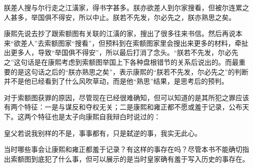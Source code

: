 
\begin{bookquote}朕差人搜与尔行走之江潢家，得书字甚多。朕亦欲差人到尔家搜看，但被尔连累之人甚多，举国俱不得安，所以中止。朕若不先发，尔必先之，朕亦熟思之矣。\end{bookquote}


康熙先说去抄了跟索额图有关联的江潢的家，搜出了很多往来书信。然后再说本来“欲差人”去索额图家“搜看”，但预料到在索额图家里会搜出来更多的材料，牵扯出更多人，导致“举国俱不得安”，所以最后打消了念头。“朕若不先发，尔必先之”这句话是在康熙考虑到索额图举国上下各种盘根错节的关系后说出的。而最重要的是这句话之后的“朕亦熟思之矣”，表示康熙的“朕若不先发，尔必先之”的判断并不是他已经看到了什么风吹草动，而是他“熟思”结果，是思考后的预判。



对于索额图获罪的原因，尽管现在已经很难确知，但可以知道的是其所犯之罪应该有两个特征：一是与谋反和夺权无关；二是康熙和雍正都不愿或羞于记录，公布天下。这两个特征也是太子向康熙自我辩白时说过的：



\begin{bookquote}皇父若说我别样的不是，事事都有，只是弑逆的事，我实无此心。\end{bookquote}


当时哪些事会让康熙和雍正都羞于记录？有这样的事存在吗？尽管本书不能确切指出索额图到底犯了什么事，但可以展示的是当时皇家确有羞于写入历史的事存在。


